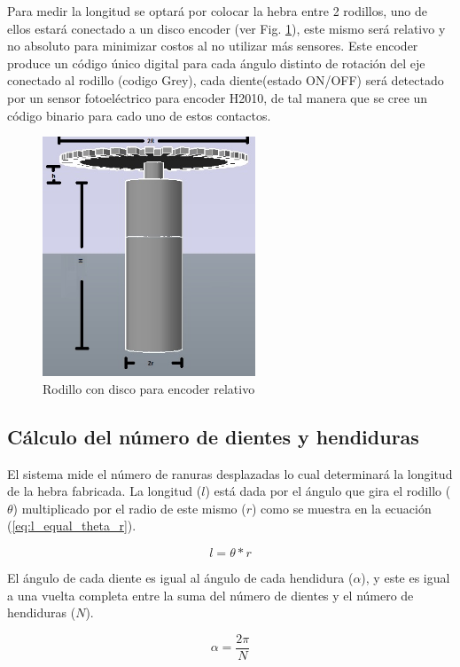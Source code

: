\documentclass[main_conf.tex]{subfiles}
\begin{document}
Para medir la longitud se optará por colocar la hebra entre 2
rodillos, uno de ellos estará conectado a un disco encoder (ver
Fig. \ref{rodillo_con_disco}), este mismo será relativo y no
absoluto para minimizar costos al no utilizar más sensores. Este
encoder produce un código único digital para cada ángulo distinto
de rotación del eje conectado al rodillo (codigo Grey), cada
diente(estado ON/OFF) será detectado por un sensor fotoeléctrico
para encoder H2010, de tal manera que se cree un código binario
para cado uno de estos contactos.


\begin{figure}[!t]
  \centering
  \includegraphics[width=2.5in]{../img/rodillo_con_disco.jpg}
  \caption{Rodillo con disco para encoder relativo}
  \label{rodillo_con_disco}
\end{figure}

\subsection{Cálculo del número de dientes y hendiduras}
\label{sec:estimador:dientes}
El sistema mide el número de ranuras desplazadas lo cual determinará
la longitud de la hebra fabricada. La longitud ($l$) está dada por
el ángulo que gira el rodillo ($\theta$) multiplicado por el radio
de este mismo ($r$) como se muestra en la ecuación
(\ref{eq:l_equal_theta_r}).

\begin{equation}
\label{eq:l_equal_theta_r}
l = \theta * r
\end{equation}

El ángulo de cada diente es igual al ángulo de cada hendidura ($\alpha$),
y este es igual a una vuelta completa
entre la suma del número de dientes y el número de hendiduras ($N$).

\begin{equation}
\label{eq:alpha_equ_2pi_N}
\alpha=\frac{2\pi}{N}
\end{equation}
\end{document}
